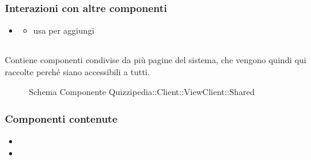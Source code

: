 \subsubsection{Interazioni con altre componenti}
\begin{itemize}
\item {}
\begin{itemize}
\item usa  per aggiungi
\end{itemize}
\end{itemize}
\subsection{}
Contiene componenti condivise da più pagine del sistema, che vengono quindi qui raccolte perché siano accessibili a tutti.
\begin{figure}[H]
\centering
\noindent{}
\caption[Schema Componente Quizzipedia::Client::ViewClient::Shared]{Schema Componente Quizzipedia::Client::ViewClient::Shared}
\end{figure}
\subsubsection{Componenti contenute}
\begin{itemize}
\item {}
\item {}
\end{itemize}
